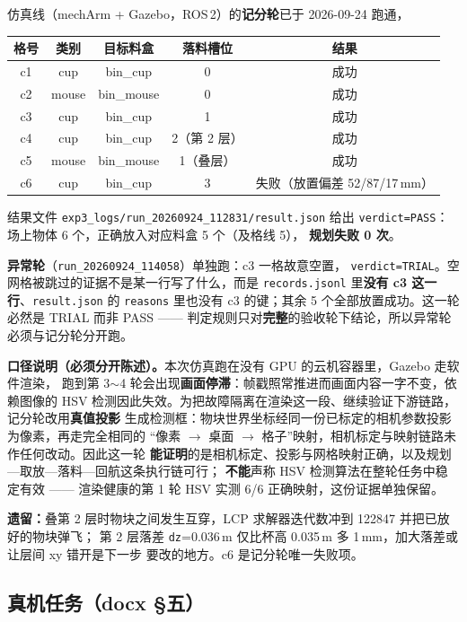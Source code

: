 \documentclass[12pt,a4paper]{ctexart}
\begin{document}
仿真线（mechArm + Gazebo，ROS\,2）的\textbf{记分轮}已于 2026-09-24 跑通，
\begin{center}
\begin{tabular}{@{}ccccc@{}}
\toprule
格号 & 类别 & 目标料盒 & 落料槽位 & 结果 \\
\midrule
c1 & cup   & bin\_cup   & 0 & 成功 \\
c2 & mouse & bin\_mouse & 0 & 成功 \\
c3 & cup   & bin\_cup   & 1 & 成功 \\
c4 & cup   & bin\_cup   & 2（第 2 层） & 成功 \\
c5 & mouse & bin\_mouse & 1（叠层） & 成功 \\
c6 & cup   & bin\_cup   & 3 & 失败（放置偏差 52/87/17\,mm） \\
\bottomrule
\end{tabular}
\end{center}
结果文件 \texttt{exp3\_logs/run\_20260924\_112831/result.json} 给出
\texttt{verdict=PASS}：场上物体 6 个，正确放入对应料盒 5 个（及格线 5），
\textbf{规划失败 0 次}。

\textbf{异常轮}（\texttt{run\_20260924\_114058}）单独跑：c3 一格故意空置，
\texttt{verdict=TRIAL}。空网格被跳过的证据不是某一行写了什么，而是
\texttt{records.jsonl} 里\textbf{没有 c3 这一行}、\texttt{result.json} 的
\texttt{reasons} 里也没有 c3 的键；其余 5 个全部放置成功。这一轮必然是 TRIAL 而非
PASS —— 判定规则只对\textbf{完整}的验收轮下结论，所以异常轮必须与记分轮分开跑。

\textbf{口径说明（必须分开陈述）。}本次仿真跑在没有 GPU 的云机容器里，Gazebo 走软件渲染，
跑到第 3$\sim$4 轮会出现\textbf{画面停滞}：帧戳照常推进而画面内容一字不变，依赖图像的
HSV 检测因此失效。为把故障隔离在渲染这一段、继续验证下游链路，记分轮改用\textbf{真值投影}
生成检测框：物块世界坐标经同一份已标定的相机参数投影为像素，再走完全相同的
“像素 $\to$ 桌面 $\to$ 格子”映射，相机标定与映射链路未作任何改动。因此这一轮
\textbf{能证明}的是相机标定、投影与网格映射正确，以及规划—取放—落料—回航这条执行链可行；
\textbf{不能}声称 HSV 检测算法在整轮任务中稳定有效 —— 渲染健康的第 1 轮 HSV 实测
6/6 正确映射，这份证据单独保留。

\textbf{遗留：}叠第 2 层时物块之间发生互穿，LCP 求解器迭代数冲到 122847 并把已放好的物块弹飞；
第 2 层落差 \texttt{dz}=0.036\,m 仅比杯高 0.035\,m 多 1\,mm，加大落差或让层间 xy 错开是下一步
要改的地方。c6 是记分轮唯一失败项。

\subsection*{真机任务（docx §五）}
\end{document}

